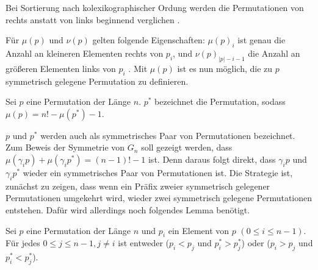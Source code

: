 \documentclass[a4paper, 11pt, ngerman]{article}
\begin{document}
Bei Sortierung nach kolexikographischer Ordung werden die Permutationen von rechts anstatt von links beginnend verglichen \cite{lexicographic}.

Für $\mu(p)$ und $\nu(p)$ gelten folgende Eigenschaften: $\mu(p)_i$ ist genau die Anzahl an kleineren Elementen rechts von $p_i$, und $\nu(p)_{|p| - i - 1}$ die Anzahl an größeren Elementen links von $p_i$ \cite{factorial}. Mit $\mu(p)$ ist es nun möglich, die zu $p$ symmetrisch gelegene Permutation zu definieren.

\begin{definition}
    Sei $p$ eine Permutation der Länge $n$. $p^*$ bezeichnet die Permutation, sodass $\mu(p) = n! - \mu(p^*) - 1$.
\end{definition}

$p$ und $p^*$ werden auch als symmetrisches Paar von Permutationen bezeichnet. Zum Beweis der Symmetrie von $G_n$ soll gezeigt werden, dass $\mu(\gamma_i p) + \mu(\gamma_i p^*) = (n - 1)! - 1$ ist. Denn daraus folgt direkt, dass $\gamma_i p$ und $\gamma_i p^*$ wieder ein symmetrisches Paar von Permutationen ist. Die Strategie ist, zunächst zu zeigen, dass wenn ein Präfix zweier symmetrisch gelegener Permutationen umgekehrt wird, wieder zwei symmetrisch gelegene Permutationen entstehen. Dafür wird allerdings noch folgendes Lemma benötigt.

\begin{lemma}
    Sei $p$ eine Permutation der Länge $n$ und $p_i$ ein Element von $p$ $(0 \le i \le n - 1)$. Für jedes $0 \le j \le n-1, j \ne i$ ist entweder ($p_i < p_j$ und $p^*_i > p^*_j$) oder ($p_i > p_j$ und $p^*_i < p^*_j$).
\end{lemma}
\end{document}
